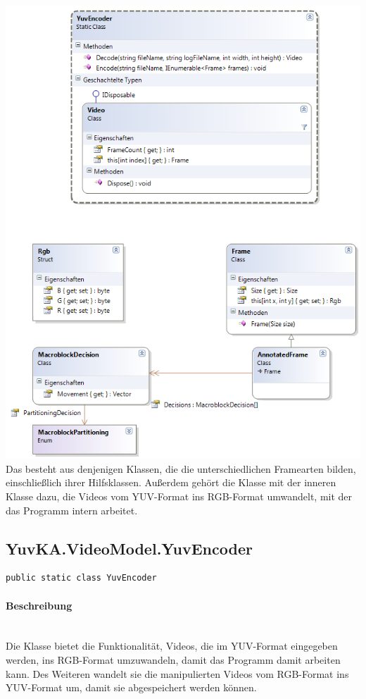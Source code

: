 \includegraphics[width=\textwidth]{YuvKA.VideoModel/videomodel.png}
Das  besteht aus denjenigen Klassen, die die unterschiedlichen Framearten bilden, einschließlich ihrer Hilfsklassen. Außerdem gehört die Klasse  mit der inneren Klasse  dazu, die Videos vom YUV-Format ins RGB-Format umwandelt, mit der das Programm intern arbeitet.

\subsection{YuvKA.VideoModel.YuvEncoder}

\begin{verbatim}
public static class YuvEncoder
\end{verbatim}

\paragraph{Beschreibung}~\\
Die Klasse  bietet die Funktionalität, Videos, die im YUV-Format eingegeben werden, ins RGB-Format umzuwandeln, damit das Programm damit arbeiten kann. Des Weiteren wandelt sie die manipulierten Videos vom RGB-Format ins YUV-Format um, damit sie abgespeichert werden können.

